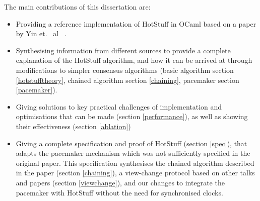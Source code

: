 The main contributions of this dissertation are:
\begin{itemize}
	\item Providing a reference implementation of HotStuff in OCaml based on a paper by Yin et. ~al~ \cite{yin2019hotstuff}.
	\item Synthesising information from different sources to provide a complete explanation of the HotStuff algorithm, and how it can be arrived at through modifications to simpler consensus algorithms (basic algorithm section \ref{hotstufftheory}, chained algorithm section \ref{chaining}, pacemaker section \ref{pacemaker}).
	\item Giving solutions to key practical challenges of implementation and optimisations that can be made (section \ref{performance}), as well as showing their effectiveness (section \ref{ablation})
	\item Giving a complete specification and proof of HotStuff (section \ref{spec}), that adapts the pacemaker mechanism which was not sufficiently specified in the original paper. This specification synthesises the chained algorithm described in the paper (section \ref{chaining}), a view-change protocol based on other talks and papers (section \ref{viewchange}), and our changes to integrate the pacemaker with HotStuff without the need for synchronised clocks.
\end{itemize}